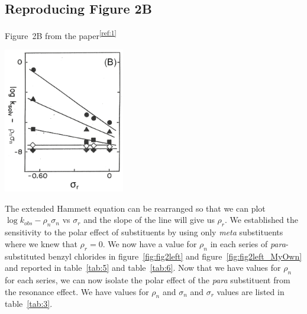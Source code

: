 \documentclass{tufte-handout}
\newcommand{\tss}[1]{\textsuperscript{#1}}
\begin{document}
\subsection{Reproducing Figure 2B}

\begin{marginfigure}[0mm]
  \centering
    \caption[-0mm]{Figure~2B from the paper\tss{\ref{ref:1}} \label{fig:paperfig2B}}  
    \includegraphics[width=150pt]{images/fig2Bpaper.png}
\end{marginfigure}


The extended Hammett equation can be rearranged so that we can plot $\log{k_{obs}}-\rho_n \sigma_n$ vs $\sigma_r$ and the slope of the line will give us $\rho_r$.  We established the sensitivity to the polar effect of substituents by using only \textit{meta} substituents where we knew that $\rho_r = 0$. We now have a value for $\rho_n$ in each series of \textit{para}-substituted benzyl chlorides in figure~\vref{fig:fig2left} and figure~\vref{fig:fig2left_MyOwn} and reported in table~\vref{tab:5} and table~\vref{tab:6}. Now that we have values for $\rho_n$ for each series, we can now isolate the polar effect of the \textit{para} substituent from the resonance effect. We have values for $\rho_n$ and $\sigma_n$ and $\sigma_r$ values are listed in table~\vref{tab:3}. 
\end{document}
